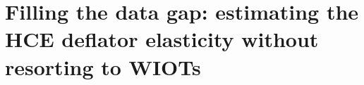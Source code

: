 \documentclass[11pt,a4paper]{paper} %
\begin{document}
%
%
%
%
%
%

\section{Filling the data gap: estimating the HCE deflator elasticity without resorting to WIOTs}
\label{sec:extrapo}
\end{document}
